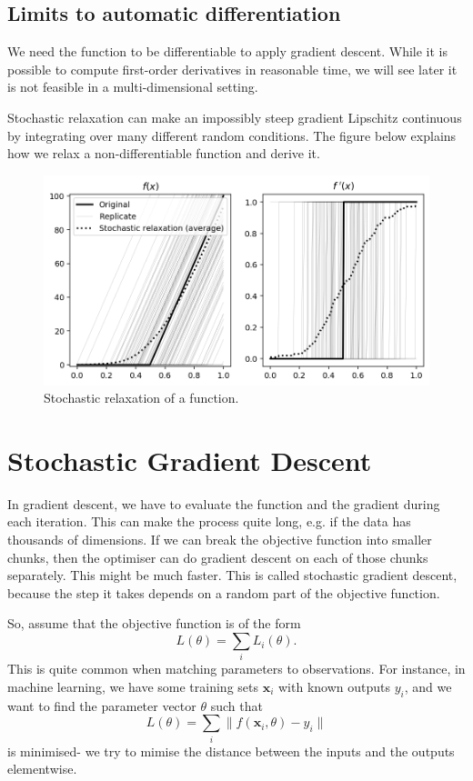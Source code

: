 \documentclass[a4paper, openany]{memoir}
\begin{document}
\subsection{Limits to automatic differentiation}
We need the function to be differentiable to apply gradient descent. While it is possible to compute first-order derivatives in reasonable time, we will see later it is not feasible in a multi-dimensional setting.

Stochastic relaxation can make an impossibly steep gradient Lipschitz continuous by integrating over many different random conditions. The figure below explains how we relax a non-differentiable function and derive it.
\begin{figure}[H]
    \centering
    \includegraphics[scale=0.65]{src/4.30 stochastic relaxation.png}
    \caption{Stochastic relaxation of a function.}
\end{figure}

\section{Stochastic Gradient Descent}
In gradient descent, we have to evaluate the function and the gradient during each iteration. This can make the process quite long, e.g. if the data has thousands of dimensions. If we can break the objective function into smaller chunks, then the optimiser can do gradient descent on each of those chunks separately. This might be much faster. This is called stochastic gradient descent, because the step it takes depends on a random part of the objective function.

So, assume that the objective function is of the form
\[L(\theta) = \sum_i L_i(\theta).\]
This is quite common when matching parameters to observations. For instance, in machine learning, we have some training sets $\mathbf{x}_i$ with known outputs $y_i$, and we want to find the parameter vector $\theta$ such that
\[L(\theta) = \sum_i \lVert f(\mathbf{x}_i, \theta) - y_i \rVert\]
is minimised- we try to mimise the distance between the inputs and the outputs elementwise.
\end{document}

